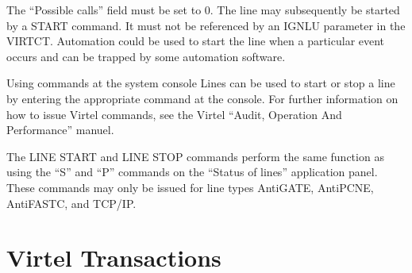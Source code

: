 \documentclass[letterpaper,10pt,english]{sphinxmanual}
\begin{document}
\ignorespaces 
\sphinxAtStartPar
{}

\sphinxAtStartPar
The “Possible calls” field must be set to 0. The line may subsequently be started by a START command. It must not be referenced by an IGNLU parameter in the VIRTCT. Automation could be used to start the line when a particular event occurs and can be trapped by some automation software.

\ignorespaces 
\sphinxAtStartPar
{}

\sphinxAtStartPar
Using commands at the system console Lines can be used to start or stop a line by entering the appropriate command at the console. For further information on how to issue Virtel commands, see the Virtel “Audit, Operation And Performance” manuel.

\begin{sphinxVerbatim}[commandchars=\\\{\}]
  
  

        
\end{sphinxVerbatim}

\sphinxAtStartPar
The LINE START and LINE STOP commands perform the same function as using the “S” and “P” commands on the “Status of lines” application panel. These commands may only be issued for line types AntiGATE, AntiPCNE, AntiFASTC, and TCP/IP.

\ignorespaces 

\chapter{Virtel Transactions}
\label{\detokenize{Customization:virtel-transactions}}\label{\detokenize{Customization:index-56}}
\ignorespaces 
\end{document}
